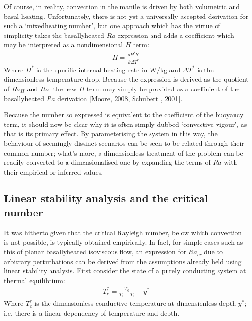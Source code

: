 \documentclass[letterpaper,10pt,english]{jupyterBook}
\begin{document}
\sphinxAtStartPar
Of course, in reality, convection in the mantle is driven by both volumetric and basal heating. Unfortunately, there is not yet a universally accepted derivation for such a ‘mixed\sphinxhyphen{}heating  number’, but one approach which has the virtue of simplicity takes the basally\sphinxhyphen{}heated \(Ra\) expression and adds a coefficient which may be interpreted as a non\sphinxhyphen{}dimensional \(H\) term:
\begin{equation*}
\begin{split} H = \frac{\rho H^* b^2}{k \Delta T^*} \end{split}
\end{equation*}
\sphinxAtStartPar
Where \(H^{*}\) is the specific internal heating rate in W/kg and \({\Delta T}^{*}\) is the dimensionless temperature drop. Because the expression is derived as the quotient of \({Ra}_H\) and \(Ra\), the new \(H\) term may simply be provided as a coefficient of the basally\sphinxhyphen{}heated \(Ra\) derivation {[}\hyperlink{cite.references:id667}{Moore, 2008}, \hyperlink{cite.references:id663}{Schubert , 2001}{]}.

\sphinxAtStartPar
Because the  number so expressed is equivalent to the coefficient of the buoyancy term, it should now be clear why it is often simply dubbed ‘convective vigour’, as that is its primary effect. By parameterising the system in this way, the behaviour of seemingly distinct scenarios can be seen to be related through their common  number; what’s more, a dimensionless treatment of the problem can be readily converted to a dimensionalised one by expanding the terms of \(Ra\) with their empirical or inferred values.


\subsection{Linear stability analysis and the critical  number}
\label{\detokenize{content/chapter_02_methods/section1:linear-stability-analysis-and-the-critical-rayleigh-number}}
\sphinxAtStartPar
It was hitherto given that the critical Rayleigh number, below which convection is not possible, is typically obtained empirically. In fact, for simple cases such as this of planar basally\sphinxhyphen{}heated isoviscous flow, an expression for \(Ra_{cr}\) due to arbitrary perturbations can be derived from the assumptions already held using linear stability analysis. First consider the state of a purely conducting system at thermal equilibrium:
\begin{equation*}
\begin{split} T_c^* = \frac{T_0}{T_1 - T_0} + y^* \end{split}
\end{equation*}
\sphinxAtStartPar
Where \(T_c^*\) is the dimensionless conductive temperature at dimensionless depth \(y^*\); i.e. there is a linear dependency of temperature and depth.
\end{document}
